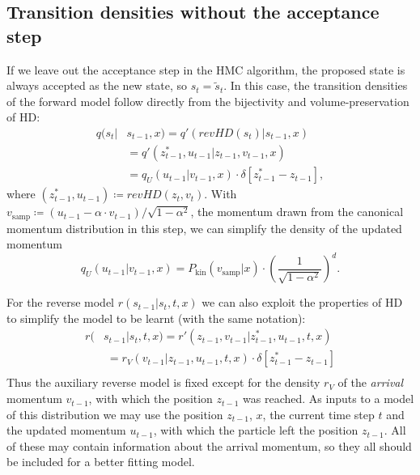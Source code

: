 \subsection{Transition densities without the acceptance step}
\label{sec:TransitionDensitiesNoAcceptance}
If we leave out the acceptance step in the HMC algorithm, the proposed state is always accepted as the new state, so $s_t = \tilde{s}_t$. In this case, the transition densities of the forward model follow directly from the bijectivity and volume-preservation of HD:
\begin{equation} \label{eq:ForwardTransitionNoAcceptance}
\begin{split}
q(s_t|&s_{t-1}, x) = q'(revHD(s_t)|s_{t-1}, x) \\
&= q'(z^*_{t-1}, u_{t-1} |z_{t-1}, v_{t-1}, x) \\
&= q_U(u_{t-1}|v_{t-1}, x) \cdot \delta[{z}^*_{t-1} - z_{t-1}],
\end{split}
\end{equation}
where $(z^*_{t-1}, u_{t-1}) \coloneqq revHD(z_t, v_t)$. With $v_{\textrm{samp}} \coloneqq (u_{t-1} - \alpha \cdot v_{t-1})/{\sqrt{1 - \alpha^2}}$, the momentum drawn from the canonical momentum distribution in this step, we can simplify the density of the updated momentum
\begin{equation} \label{eq:qUDefinition}
q_U(u_{t-1}|v_{t-1}, x) = P_\textrm{kin}(v_{\textrm{samp}}|x) \cdot (\frac{1}{\sqrt{1 - \alpha^2}})^{d}.
\end{equation}

For the reverse model $r(s_{t-1}|s_t, t, x)$ we can also exploit the properties of HD to simplify the model to be learnt (with the same notation):
\begin{equation} \label{eq:ReverseTransitionNoAcceptance}
\begin{split}
r(&s_{t-1}|s_{t}, t, x) = r'(z_{t-1}, v_{t-1} |z^*_{t-1}, u_{t-1},t , x) \\
&\;= r_V(v_{t-1}|z_{t-1}, u_{t-1}, t, x) \cdot \delta[z^*_{t-1} - z_{t-1}] \\
\end{split}
\end{equation}
Thus the auxiliary reverse model is fixed except for the density $r_V$ of the \textit{arrival} momentum $v_{t-1}$, with which the position $z_{t-1}$ was reached. As inputs to a model of this distribution we may use the position $z_{t-1}$, $x$, the current time step $t$ and the updated momentum $u_{t-1}$, with which the particle left the position $z_{t-1}$. All of these may contain information about the arrival momentum, so they all should be included for a better fitting model.

